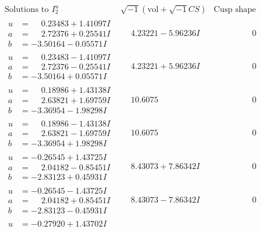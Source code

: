 \documentclass[1p]{elsarticle_modified}
\theoremstyle{definition}
\newcommand{\I}{\sqrt{-1}}
\begin{document}
$$\begin{array}{c|c|c}
\text{Solutions to }I^u_{2}& \I (\text{vol} + \sqrt{-1}CS) & \text{Cusp shape}\\
 \hline 
\begin{aligned}
u &= \phantom{-}0.23483 + 1.41097 I \\
a &= \phantom{-}2.72376 + 0.25541 I \\
b &= -3.50164 - 0.05571 I\end{aligned}
 & \phantom{-}4.23221 - 5.96236 I & \phantom{-0.000000 } 0 \\ \hline\begin{aligned}
u &= \phantom{-}0.23483 - 1.41097 I \\
a &= \phantom{-}2.72376 - 0.25541 I \\
b &= -3.50164 + 0.05571 I\end{aligned}
 & \phantom{-}4.23221 + 5.96236 I & \phantom{-0.000000 } 0 \\ \hline\begin{aligned}
u &= \phantom{-}0.18986 + 1.43138 I \\
a &= \phantom{-}2.63821 + 1.69759 I \\
b &= -3.36954 - 1.98298 I\end{aligned}
 & \phantom{-}10.6075\phantom{ +0.000000I} & \phantom{-0.000000 } 0 \\ \hline\begin{aligned}
u &= \phantom{-}0.18986 - 1.43138 I \\
a &= \phantom{-}2.63821 - 1.69759 I \\
b &= -3.36954 + 1.98298 I\end{aligned}
 & \phantom{-}10.6075\phantom{ +0.000000I} & \phantom{-0.000000 } 0 \\ \hline\begin{aligned}
u &= -0.26545 + 1.43725 I \\
a &= \phantom{-}2.04182 - 0.85451 I \\
b &= -2.83123 + 0.45931 I\end{aligned}
 & \phantom{-}8.43073 + 7.86342 I & \phantom{-0.000000 } 0 \\ \hline\begin{aligned}
u &= -0.26545 - 1.43725 I \\
a &= \phantom{-}2.04182 + 0.85451 I \\
b &= -2.83123 - 0.45931 I\end{aligned}
 & \phantom{-}8.43073 - 7.86342 I & \phantom{-0.000000 } 0 \\ \hline\begin{aligned}
u &= -0.27920 + 1.43702 I \\

\end{aligned}
\end{array}$$
\end{document}
